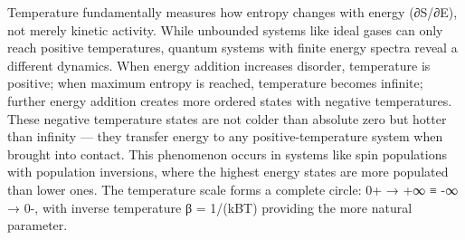 Temperature fundamentally measures how entropy changes with energy (∂S/∂E), not merely kinetic activity. While unbounded systems like ideal gases can only reach positive temperatures, quantum systems with finite energy spectra reveal a different dynamics. When energy addition increases disorder, temperature is positive; when maximum entropy is reached, temperature becomes infinite; further energy addition creates more ordered states with negative temperatures. These negative temperature states are not colder than absolute zero but hotter than infinity — they transfer energy to any positive-temperature system when brought into contact. This phenomenon occurs in systems like spin populations with population inversions, where the highest energy states are more populated than lower ones. The temperature scale forms a complete circle: 0+ → +∞ ≡ -∞ → 0-, with inverse temperature β = 1/(kBT) providing the more natural parameter.
